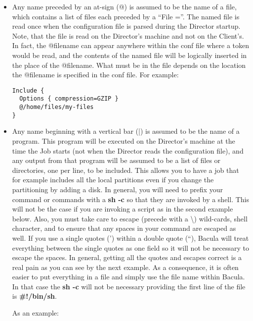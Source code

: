 \begin{itemize}
\item Any name preceded by an at-sign (@) is assumed to be the  name of a
   file, which contains a list of files each preceded by a ``File =''.  The
   named file is read once when the configuration file is parsed during the
   Director startup.  Note, that the file is read on the Director's machine
   and not on the Client's.  In fact, the @filename can appear anywhere
   within the conf file where a token would be read, and the contents of
   the named file will be logically inserted in the place of the @filename.
   What must be in the file depends on the location the @filename is
   specified in the conf file.  For example:

\footnotesize
\begin{verbatim}
Include {
  Options { compression=GZIP }
  @/home/files/my-files
}
\end{verbatim}
\normalsize

\item Any name beginning with a vertical bar (|) is  assumed to be the name of
   a program.  This program will be executed on the Director's machine at
   the time the Job starts (not when the Director reads the configuration
   file), and any output from that program will be assumed to be a list of
   files or directories, one per line, to be included.  This allows you to
   have a job that for example includes all the local partitions even if
   you change the partitioning by adding a disk.  In general, you will need
   to prefix your command or commands with a {\bf sh -c} so that they are
   invoked by a shell.  This will not be the case if you are invoking a
   script as in the second example below.  Also, you must take care to
   escape (precede with a \textbackslash{}) wild-cards, shell character,
   and to ensure that any spaces in your command are escaped as well.  If
   you use a single quotes (') within a double quote (``), Bacula will
   treat everything between the single quotes as one field so it will not
   be necessary to escape the spaces.  In general, getting all the quotes
   and escapes correct is a real pain as you can see by the next example.
   As a consequence, it is often easier to put everything in a file and
   simply use the file name within Bacula.  In that case the {\bf sh -c}
   will not be necessary providing the first line of the file is {\bf
   \#!/bin/sh}.

   As an  example: 

\footnotesize
\begin{verbatim}
 

\end{verbatim}
\end{itemize}
